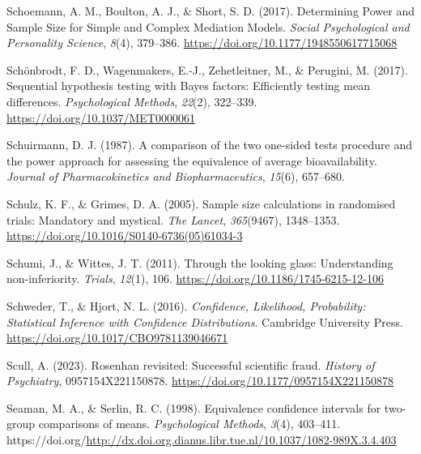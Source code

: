 \documentclass[
  letterpaper,
  DIV=11,
  numbers=noendperiod]{scrreprt}
\newlength{\cslhangindent}
\newlength{\cslentryspacingunit} %
\newenvironment{CSLReferences}[2] %
 {%
  \setlength{\parindent}{0pt}
  \ifodd #1
  \let\oldpar\par
  \def\par{\hangindent=\cslhangindent\oldpar}
  \fi
  \setlength{\parskip}{#2\cslentryspacingunit}
 }%
 {}
\begin{document}
\begin{CSLReferences}{1}{0}
\leavevmode{}%
Schoemann, A. M., Boulton, A. J., \& Short, S. D. (2017). Determining
{Power} and {Sample Size} for {Simple} and {Complex Mediation Models}.
\emph{Social Psychological and Personality Science}, \emph{8}(4),
379--386. \url{https://doi.org/10.1177/1948550617715068}

\leavevmode{}%
Schönbrodt, F. D., Wagenmakers, E.-J., Zehetleitner, M., \& Perugini, M.
(2017). Sequential hypothesis testing with {Bayes} factors:
{Efficiently} testing mean differences. \emph{Psychological Methods},
\emph{22}(2), 322--339. \url{https://doi.org/10.1037/MET0000061}

\leavevmode{}%
Schuirmann, D. J. (1987). A comparison of the two one-sided tests
procedure and the power approach for assessing the equivalence of
average bioavailability. \emph{Journal of Pharmacokinetics and
Biopharmaceutics}, \emph{15}(6), 657--680.

\leavevmode{}%
Schulz, K. F., \& Grimes, D. A. (2005). Sample size calculations in
randomised trials: Mandatory and mystical. \emph{The Lancet},
\emph{365}(9467), 1348--1353.
\url{https://doi.org/10.1016/S0140-6736(05)61034-3}

\leavevmode{}%
Schumi, J., \& Wittes, J. T. (2011). Through the looking glass:
Understanding non-inferiority. \emph{Trials}, \emph{12}(1), 106.
\url{https://doi.org/10.1186/1745-6215-12-106}

\leavevmode{}%
Schweder, T., \& Hjort, N. L. (2016). \emph{Confidence, {Likelihood},
{Probability}: {Statistical Inference} with {Confidence Distributions}}.
{Cambridge University Press}.
\url{https://doi.org/10.1017/CBO9781139046671}

\leavevmode{}%
Scull, A. (2023). Rosenhan revisited: Successful scientific fraud.
\emph{History of Psychiatry}, 0957154X221150878.
\url{https://doi.org/10.1177/0957154X221150878}

\leavevmode{}%
Seaman, M. A., \& Serlin, R. C. (1998). Equivalence confidence intervals
for two-group comparisons of means. \emph{Psychological Methods},
\emph{3}(4), 403--411.
https://doi.org/\url{http://dx.doi.org.dianus.libr.tue.nl/10.1037/1082-989X.3.4.403}


\end{CSLReferences}
\end{document}
